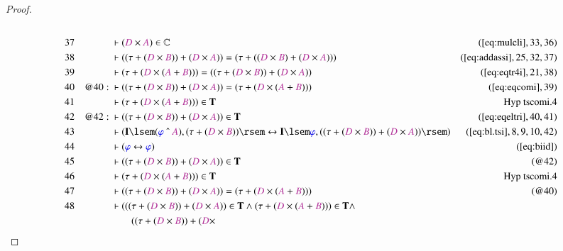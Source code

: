 \begin{proof}
\begin{align}
  \\ 37 &&  & \vdash ( \mc{D} \times \mc{A} ) \in
      \mathbb{C}&(\mbox{\ref{eq:mulcli}},33,36)\notag
  \\ 38 &&  & \vdash ( ( \tau + ( \mc{D} \times \mc{B} ) ) + ( \mc{D} \times
      \mc{A} ) ) = ( \tau + ( ( \mc{D} \times \mc{B} ) + (
      \mc{D} \times \mc{A} ) )
      )&(\mbox{\ref{eq:addassi}},25,32,37)\notag
  \\ 39 &&  & \vdash ( \tau + ( \mc{D} \times ( \mc{A} + \mc{B} ) ) ) = ( ( \tau
      + ( \mc{D} \times \mc{B} ) ) + ( \mc{D} \times \mc{A} )
      )&(\mbox{\ref{eq:eqtr4i}},21,38)\notag
  \\ 40 && @40:\  & \vdash ( ( \tau + ( \mc{D} \times \mc{B} ) ) + ( \mc{D}
      \times \mc{A} ) ) = ( \tau + ( \mc{D} \times ( \mc{A} +
      \mc{B} ) ) )&(\mbox{\ref{eq:eqcomi}},39)\notag
  \\ 41 &&  & \vdash ( \tau + ( \mc{D} \times ( \mc{A} + \mc{B} ) ) ) \in
      \mathbf{T}&\text{Hyp~tscomi.4}\notag%
  \\ 42 && @42:\  & \vdash ( ( \tau + ( \mc{D} \times \mc{B} ) ) + ( \mc{D}
      \times \mc{A} ) ) \in
      \mathbf{T}&(\mbox{\ref{eq:eqeltri}},40,41)\notag
  \\ 43 &&  & \vdash ( \mathbf{I} \lsem ( \mw{\varphi} ~\string^~ \mc{A} ) , (
      \tau + ( \mc{D} \times \mc{B} ) ) \rsem
      \leftrightarrow \mathbf{I} \lsem \mw{\varphi} , ( (
      \tau + ( \mc{D} \times \mc{B} ) ) + ( \mc{D} \times
      \mc{A} ) ) \rsem
      )&(\mbox{\ref{eq:bl.tsi}},8,9,10,42)\notag
  \\ 44 &&  & \vdash ( \mw{\varphi} \leftrightarrow \mw{\varphi}
      )&(\mbox{\ref{eq:biid}})\notag
  \\ 45 &&  & \vdash ( ( \tau + ( \mc{D} \times \mc{B} ) ) + ( \mc{D} \times
      \mc{A} ) ) \in \mathbf{T}&(@42)\notag
  \\ 46 &&  & \vdash ( \tau + ( \mc{D} \times ( \mc{A} + \mc{B} ) ) ) \in
      \mathbf{T}&\text{Hyp~tscomi.4}\notag%
  \\ 47 &&  & \vdash ( ( \tau + ( \mc{D} \times \mc{B} ) ) + ( \mc{D} \times
      \mc{A} ) ) = ( \tau + ( \mc{D} \times ( \mc{A} +
      \mc{B} ) ) )&(@40)\notag
  \\ 48 &&  & \vdash ( ( ( \tau + ( \mc{D} \times \mc{B} ) ) + ( \mc{D} \times
      \mc{A} ) ) \in \mathbf{T} \wedge ( \tau + ( \mc{D}
      \times ( \mc{A} + \mc{B} ) ) ) \in \mathbf{T} \wedge  \notag \\ & & & \qquad
      (
      ( \tau + ( \mc{D} \times \mc{B} ) ) + ( \mc{D} \times

\end{align}
\end{proof}
